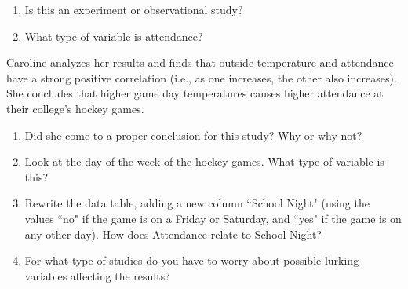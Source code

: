 \documentclass[11pt]{article}
\newcommand{\ben}{\begin{enumerate}}
\newcommand{\een}{\end{enumerate}}
\newcommand{\ans}[1]{{\color{blue} \textbf{Answer: } #1 (5 pts.)}}
\renewcommand{\ans}[1]{}
\begin{document}
\ben 
\item Is this an experiment or observational study?
\ans{Observational study. Caroline's role is passive; 
there is no assignment of temperatures to the games.
In an experiment, the temperatures would be manipulated
to make a greater temperature difference between the games,
making the results more telling of the underlying relationship
between attendance and outside temperature.}

\item What type of variable is attendance?
\ans{The response (this is the focus of the study).}

\een

Caroline analyzes her results and finds that
outside temperature and attendance have a strong
positive correlation (i.e., as one increases, the other also increases).
She concludes that higher game day temperatures causes higher
attendance at their college's hockey games.

\ben
\addtocounter{enumii}{2}
\item Did she come to a proper conclusion for this study? Why or why not?
\ans{No, you cannot come up with a causation conclusion for observational studies%
---you can do so only for experiments. There may be (and is) a lurking variable responsible
for the effect on attendance that is also correlated with outside temperature,
thus making it \emph{seem} that the temperature is causing the change in
the response.}

\item Look at the day of the week of the hockey games.
What type of variable is this?
\ans{This is a lurking variable as it could affect the response (attendance). }
 
\item 
Rewrite the data table, adding a new column ``School Night" (using the values ``no" if the game is on a Friday or Saturday, and ``yes" if the game is on any other day).
How does Attendance relate to School Night?
\ans{Attendance is noticeably higher for weekend games, during which
the weather is also warmer. It may be that games have higher attendance
when they are played on the weekend or when the weather is warmer.
We do not know from this given study.}

\item For what type of studies do you have to worry
about possible lurking variables affecting the results?
\ans{Observational studies. 
These results demonstrate the problem of drawing conclusions from
observational studies.}
\een
\end{document}
